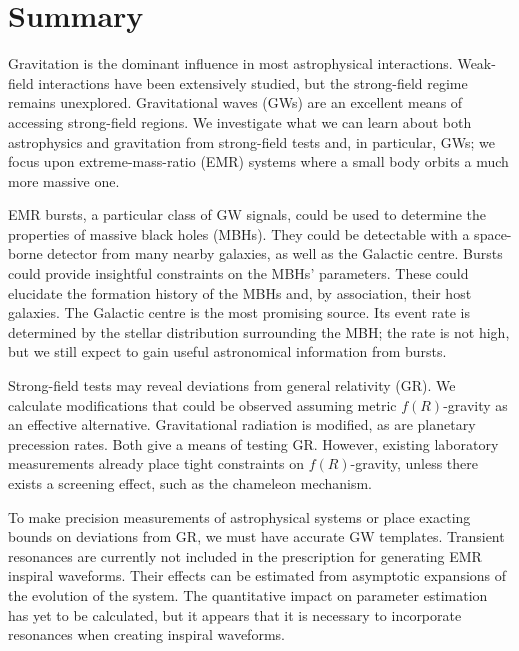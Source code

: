\chapter{Summary}
\label{summary}

Gravitation is the dominant influence in most astrophysical interactions. Weak-field interactions have been extensively studied, but the strong-field regime remains unexplored. Gravitational waves (GWs) are an excellent means of accessing strong-field regions. We investigate what we can learn about both astrophysics and gravitation from strong-field tests and, in particular, GWs; we focus upon extreme-mass-ratio (EMR) systems where a small body orbits a much more massive one.

EMR bursts, a particular class of GW signals, could be used to determine the properties of massive black holes (MBHs). They could be detectable with a space-borne detector from many nearby galaxies, as well as the Galactic centre. Bursts could provide insightful constraints on the MBHs' parameters. These could elucidate the formation history of the MBHs and, by association, their host galaxies. The Galactic centre is the most promising source. Its event rate is determined by the stellar distribution surrounding the MBH; the rate is not high, but we still expect to gain useful astronomical information from bursts.

Strong-field tests may reveal deviations from general relativity (GR). We calculate modifications that could be observed assuming metric $f(R)$-gravity as an effective alternative. Gravitational radiation is modified, as are planetary precession rates. Both give a means of testing GR. However, existing laboratory measurements already place tight constraints on $f(R)$-gravity, unless there exists a screening effect, such as the chameleon mechanism.

To make precision measurements of astrophysical systems or place exacting bounds on deviations from GR, we must have accurate GW templates. Transient resonances are currently not included in the prescription for generating EMR inspiral waveforms. Their effects can be estimated from asymptotic expansions of the evolution of the system. The quantitative impact on parameter estimation has yet to be calculated, but it appears that it is necessary to incorporate resonances when creating inspiral waveforms.
